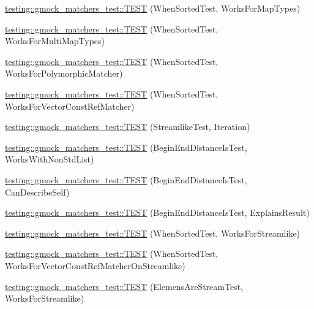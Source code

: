 \begin{DoxyCompactItemize}
\item 
\hyperlink{namespacetesting_1_1gmock__matchers__test_acc4a96f3aa369fda8f554f5ac4495f4b}{testing\+::gmock\+\_\+matchers\+\_\+test\+::\+T\+E\+ST} (When\+Sorted\+Test, Works\+For\+Map\+Types)
\item 
\hyperlink{namespacetesting_1_1gmock__matchers__test_ab5de36ad02781be67163ae24d08b5454}{testing\+::gmock\+\_\+matchers\+\_\+test\+::\+T\+E\+ST} (When\+Sorted\+Test, Works\+For\+Multi\+Map\+Types)
\item 
\hyperlink{namespacetesting_1_1gmock__matchers__test_a587c3799433426782ccdcfe5cb07f5bc}{testing\+::gmock\+\_\+matchers\+\_\+test\+::\+T\+E\+ST} (When\+Sorted\+Test, Works\+For\+Polymorphic\+Matcher)
\item 
\hyperlink{namespacetesting_1_1gmock__matchers__test_a0975bae51ce06a819dc1437134fd7f05}{testing\+::gmock\+\_\+matchers\+\_\+test\+::\+T\+E\+ST} (When\+Sorted\+Test, Works\+For\+Vector\+Const\+Ref\+Matcher)
\item 
\hyperlink{namespacetesting_1_1gmock__matchers__test_a5aa4eed927d4a1a8ea306d5e47dce94f}{testing\+::gmock\+\_\+matchers\+\_\+test\+::\+T\+E\+ST} (Streamlike\+Test, Iteration)
\item 
\hyperlink{namespacetesting_1_1gmock__matchers__test_add74820690e798ae8a365d08b68ddf71}{testing\+::gmock\+\_\+matchers\+\_\+test\+::\+T\+E\+ST} (Begin\+End\+Distance\+Is\+Test, Works\+With\+Non\+Std\+List)
\item 
\hyperlink{namespacetesting_1_1gmock__matchers__test_aa4ef2a94a7d75aa6116e8537deaa5f56}{testing\+::gmock\+\_\+matchers\+\_\+test\+::\+T\+E\+ST} (Begin\+End\+Distance\+Is\+Test, Can\+Describe\+Self)
\item 
\hyperlink{namespacetesting_1_1gmock__matchers__test_a89445da783c74dfa09c9c09531646f5b}{testing\+::gmock\+\_\+matchers\+\_\+test\+::\+T\+E\+ST} (Begin\+End\+Distance\+Is\+Test, Explains\+Result)
\item 
\hyperlink{namespacetesting_1_1gmock__matchers__test_a8de8e3760418cfcd33913cd30f16d117}{testing\+::gmock\+\_\+matchers\+\_\+test\+::\+T\+E\+ST} (When\+Sorted\+Test, Works\+For\+Streamlike)
\item 
\hyperlink{namespacetesting_1_1gmock__matchers__test_aa6bfe7b6cc288d93f60b9f52e095b233}{testing\+::gmock\+\_\+matchers\+\_\+test\+::\+T\+E\+ST} (When\+Sorted\+Test, Works\+For\+Vector\+Const\+Ref\+Matcher\+On\+Streamlike)
\item 
\hyperlink{namespacetesting_1_1gmock__matchers__test_adb0f512a2369d69f056e42e1cc5f3fc2}{testing\+::gmock\+\_\+matchers\+\_\+test\+::\+T\+E\+ST} (Elemens\+Are\+Stream\+Test, Works\+For\+Streamlike)

\end{DoxyCompactItemize}
